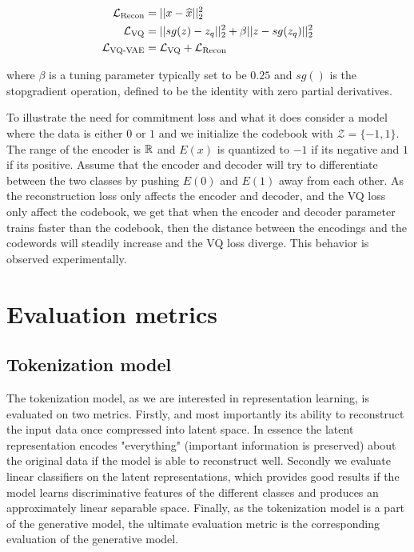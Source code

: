 \documentclass[../../thesis.tex]{subfiles}
\begin{document}
    \begin{equation}     
        \label{eq:VQVAELoss}
        \begin{aligned}
            \mathcal{L}_{\text{Recon}} &= ||x - \widehat{x}||_2^2\\
            \mathcal{L}_{\text{VQ}} &= ||sg(z) - z_q||_2^2 +\beta||z - sg(z_q)||_2^2\\
            \mathcal{L}_{\text{VQ-VAE}} &= \mathcal{L}_{\text{VQ}} + \mathcal{L}_{\text{Recon}}
        \end{aligned}
    \end{equation}

where $\beta$ is a tuning parameter typically set to be $0.25$ and $sg()$ is the stopgradient operation, defined to be the identity with zero partial derivatives. \newline

To illustrate the need for commitment loss and what it does consider a model where the data is either $0$ or $1$ and we initialize the codebook with $\mathcal{Z} = \{-1,1\}$.  The range of the encoder is $\mathbb{R}$ and $E(x)$ is quantized to $-1$ if its negative and $1$ if its positive. Assume that the encoder and decoder will try to differentiate between the two classes by pushing $E(0)$ and $E(1)$ away from each other. As the reconstruction loss only affects the encoder and decoder, and the VQ loss only affect the codebook, we get that when the encoder and decoder parameter trains faster than the codebook, then the distance between the encodings and the codewords will steadily increase and the VQ loss diverge. This behavior is observed experimentally. \newline 




\section{Evaluation metrics}

\subsection{Tokenization model}

The tokenization model, as we are interested in representation learning, is evaluated on two metrics. Firstly, and most importantly its ability to reconstruct the input data once compressed into latent space. In essence the latent representation encodes "everything" (important information is preserved) about the original data if the model is able to reconstruct well. Secondly we evaluate linear classifiers on the latent representations, which provides good results if the model learns discriminative features of the different classes and produces an approximately linear separable space. Finally, as the tokenization model is a part of the generative model, the ultimate evaluation metric is the corresponding evaluation of the generative model. 
\end{document}
